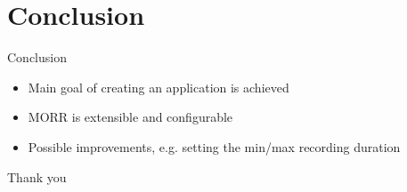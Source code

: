 \section{Conclusion}
\begin{frame}{Conclusion}
\begin{itemize}
\item{Main goal of creating an application is achieved}
\item{MORR is extensible and configurable}
\item{Possible improvements, e.g. setting the min/max recording duration}
\end{itemize}
\end{frame}

\begin{frame}[standout]
Thank you
\end{frame}